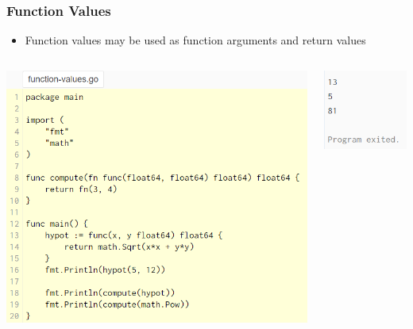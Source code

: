 \documentclass[14pt]{beamer}
\begin{document}
{
\begin{frame}
    \frametitle{Function Values}
    \begin{itemize}
        \item Function values may be used as function arguments and return values
    \end{itemize}
    \begin{columns}
        \begin{column}{0.6\textwidth}
            \includegraphics[width=\linewidth]{img/functionvalues.PNG}
        \end{column}
        \begin{column}{0.4\textwidth}
            \includegraphics[width=0.6\linewidth]{img/functionvaluesoutput.PNG}
        \end{column}
    \end{columns}
\end{frame}
}
\end{document}
